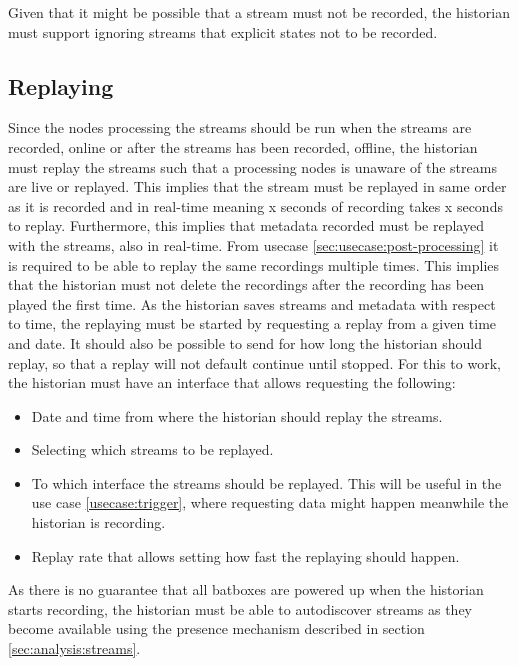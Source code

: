 Given that it might be possible that a stream must not be recorded, the historian must support ignoring streams that explicit states not to be recorded.





\subsection{Replaying}
Since the nodes processing the streams should be run when the streams are recorded, online or after the streams has been recorded, offline, the historian must replay the streams such that a processing nodes is unaware of the streams are live or replayed. This implies that the stream must be replayed in same order as it is recorded and in real-time meaning x seconds of recording takes x seconds to replay. Furthermore, this implies that metadata recorded must be replayed with the streams, also in real-time.
 From usecase \ref{sec:usecase:post-processing} it is required to be able to replay the same recordings multiple times. This implies that the historian must not delete the recordings after the recording has been played the first time.
As the historian saves streams and metadata with respect to time, the replaying must be started by requesting a replay from a given time and date. It should also be possible to send for how long the historian should replay, so that a replay will not default continue until stopped. For this to work, the historian must have an interface that allows requesting the following:


\begin{itemize}
	\item Date and time from where the historian should replay the streams.
	\item Selecting which streams to be replayed.
	\item To which interface the streams should be replayed. This will be useful in the use case \ref{usecase:trigger}, where requesting data might happen meanwhile the historian is recording.
	\item Replay rate that allows setting how fast the replaying should happen. 
\end{itemize}

As there is no guarantee that all batboxes are powered up when the historian starts recording, the historian must be able to autodiscover streams as they become available using the presence mechanism described in section \ref{sec:analysis:streams}.

